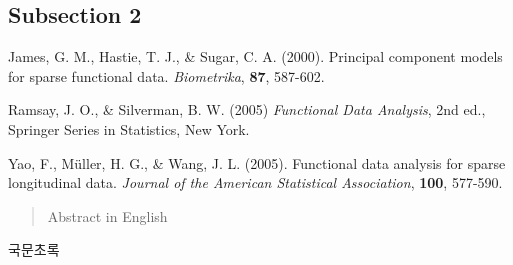 \documentclass[12pt,b5paper]{cau-thesis} %
\begin{document}
    \subsection{Subsection 2}
    
    
    \newpage
    
    \begin{thebibliography}{}
    
        James, G. M., Hastie, T. J., \& Sugar, C. A. (2000). Principal component models for sparse functional data. {\em Biometrika}, {\bf 87}, 587-602.
         
        Ramsay, J. O., \& Silverman, B. W. (2005) {\em Functional Data Analysis}, 2nd ed., Springer Series in Statistics, New York.
        
        Yao, F., Müller, H. G., \& Wang, J. L. (2005). Functional data analysis for sparse longitudinal data. {\em Journal of the American Statistical Association}, {\bf 100}, 577-590.
    
    \end{thebibliography}
    
    \newpage
    
    \begin{abstract}
    	Abstract in English
        
    \end{abstract}
    
    \begin{kabstract}
        국문초록
        
    \end{kabstract}
\end{document}
